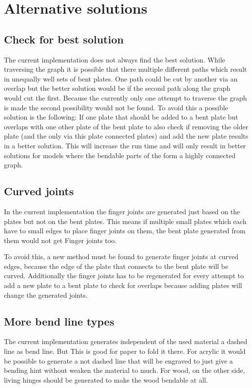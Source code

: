 \documentclass[../ClassicThesis.tex]{subfiles}
\begin{document}
\section{Alternative solutions}

\subsection{Check for best solution}

The current implementation does not always find the best solution. While traversing the graph it is possible that there multiple different paths which result in unequally well sets of bent plates. One path could be cut by another via an overlap but the better solution would be if the second path along the graph would cut the first. Because the currently only one attempt to traverse the graph is made the second possibility would not be found.
To avoid this a possible solution is the following: If one plate that should be added to a bent plate but overlaps with one other plate of the bent plate to also check if removing the older plate (and the only via this plate connected plates) and add the new plate results in a better solution.
This will increase the run time and will only result in better solutions for models where the bendable parts of the \threedmodel{} form a highly connected graph.

\subsection{Curved joints}

In the current implementation the finger joints are generated just based on the plates but not on the bent plates. This means if multiple small plates which each have to small edges to place finger joints on them, the bent plate generated from them would not get Finger joints too.

To avoid this, a new method must be found to generate finger joints at curved edges, because the edge of the plate that connects to the bent plate  will be curved. Additionally the finger joints has to be regenerated for every attempt to add a new plate to a bent plate to check for overlaps because adding plates will change the generated joints.

\subsection{More bend line types}

The current implementation generates independent of the used material a dashed line as bend line. But This is good for paper to fold it there. For acrylic it would be possible to generate a not dashed line that will be engraved to just give a bending hint without weaken the material to much. For wood, on the other side, living hinges should be generated to make the wood bendable at all.
\end{document}

